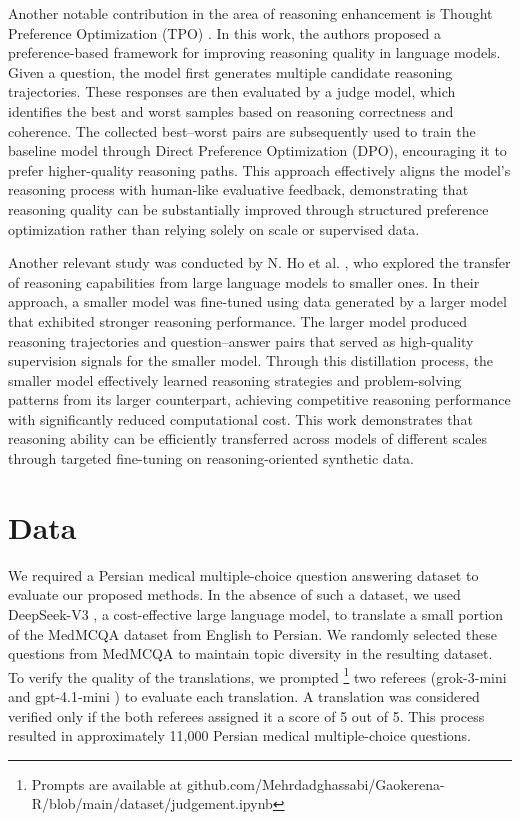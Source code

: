 \documentclass[conference]{IEEEtran}
\begin{document}
Another notable contribution in the area of reasoning enhancement is Thought Preference Optimization (TPO)
\cite{b18}. 
In this work, the authors proposed a preference-based framework for improving reasoning quality in language models. Given a question, the model first generates multiple candidate reasoning trajectories. These responses are then evaluated by a judge model, which identifies the best and worst samples based on reasoning correctness and coherence. The collected best–worst pairs are subsequently used to train the baseline model through Direct Preference Optimization (DPO), encouraging it to prefer higher-quality reasoning paths. This approach effectively aligns the model’s reasoning process with human-like evaluative feedback, demonstrating that reasoning quality can be substantially improved through structured preference optimization rather than relying solely on scale or supervised data.

Another relevant study was conducted by N. Ho et al.
\cite{b19},
who explored the transfer of reasoning capabilities from large language models to smaller ones. In their approach, a smaller model was fine-tuned using data generated by a larger model that exhibited stronger reasoning performance. The larger model produced reasoning trajectories and question–answer pairs that served as high-quality supervision signals for the smaller model. Through this distillation process, the smaller model effectively learned reasoning strategies and problem-solving patterns from its larger counterpart, achieving competitive reasoning performance with significantly reduced computational cost. This work demonstrates that reasoning ability can be efficiently transferred across models of different scales through targeted fine-tuning on reasoning-oriented synthetic data.

         \section{Data}
We required a Persian medical multiple-choice question answering dataset to evaluate our proposed methods. In the absence of such a dataset, we used DeepSeek-V3
\cite{b20}
, a cost-effective large language model, to translate a small portion of the MedMCQA dataset from English to Persian. We randomly selected these questions from 
MedMCQA
\cite{b21}
 to maintain topic diversity in the resulting dataset. To verify the quality of the translations, we prompted
\footnote{Prompts are available at github.com/Mehrdadghassabi/Gaokerena-R/blob/main/dataset/judgement.ipynb}
 two referees (grok-3-mini
\cite{b22}
 and gpt-4.1-mini
\cite{b23}
)
 to evaluate each translation. A translation was considered verified only if the both referees assigned it a score of 5 out of 5. This process resulted in approximately 11,000 Persian medical multiple-choice questions.
\end{document}
